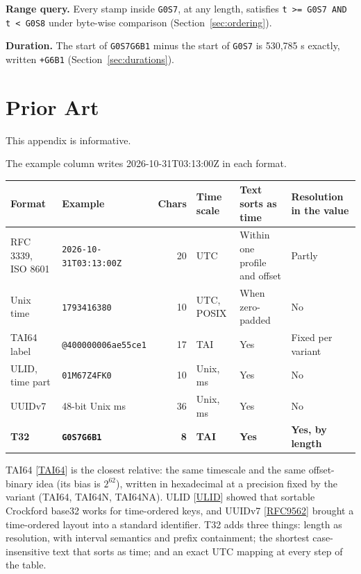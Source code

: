 \documentclass[11pt]{article}
\newcommand{\lit}[1]{\texttt{#1}}
\newcommand{\pow}[2]{\ensuremath{#1^{#2}}}
\newcommand{\Sec}[1]{Section~\ref{#1}}
\newcommand{\xref}[1]{[\hyperref[ref:#1]{#1}]}
\begin{document}
\textbf{Range query.} Every stamp inside \lit{G0S7}, at any length, satisfies
\lit{t >= \textquotesingle G0S7\textquotesingle{} AND t < \textquotesingle G0S8\textquotesingle} under byte-wise
comparison (\Sec{sec:ordering}).

\textbf{Duration.} The start of \lit{G0S7G6B1} minus the start of
\lit{G0S7} is 530,785 s exactly, written \lit{+G6B1} (\Sec{sec:durations}).

\section{Prior Art}\label{app:prior}

This appendix is informative.

The example column writes 2026-10-31T03:13:00Z in each format.

\begin{center}
\footnotesize
\begin{tabularx}{\textwidth}{@{}>{\raggedright}p{5.6em}lr>{\raggedright}p{4.6em}>{\raggedright}X>{\raggedright\arraybackslash}X@{}}
\toprule
Format & Example & Chars & Time scale & Text sorts as time & Resolution in the value \\
\midrule
RFC 3339, ISO 8601 & \lit{2026-10-31T03:13:00Z} & 20 & UTC & Within one profile and offset & Partly \\
Unix time & \lit{1793416380} & 10 & UTC, POSIX & When zero-padded & No \\
TAI64 label & \lit{@400000006ae55ce1} & 17 & TAI & Yes & Fixed per variant \\
ULID, time part & \lit{01M67Z4FK0} & 10 & Unix, ms & Yes & No \\
UUIDv7 & 48-bit Unix ms & 36 & Unix, ms & Yes & No \\
\textbf{T32} & \lit{\textbf{G0S7G6B1}} & \textbf{8} & \textbf{TAI} & \textbf{Yes} & \textbf{Yes, by length} \\
\bottomrule
\end{tabularx}
\end{center}

TAI64 \xref{TAI64} is the closest relative: the same timescale and the same
offset-binary idea (its bias is \pow{2}{62}), written in hexadecimal at a
precision fixed by the variant (TAI64, TAI64N, TAI64NA). ULID \xref{ULID}
showed that sortable Crockford base32 works for time-ordered keys, and UUIDv7
\xref{RFC9562} brought a time-ordered layout into a standard identifier. T32
adds three things: length as resolution, with interval semantics and prefix
containment; the shortest case-insensitive text that sorts as time; and an
exact UTC mapping at every step of the table.
\end{document}
